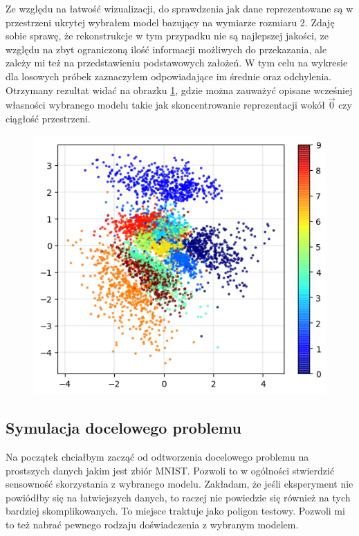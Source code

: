 Ze względu na łatwość wizualizacji, do sprawdzenia jak dane reprezentowane są w przestrzeni ukrytej wybrałem model bazujący na wymiarze rozmiaru 2. Zdaję sobie sprawę, że rekonstrukcje w tym przypadku nie są najlepszej jakości, ze względu na zbyt ograniczoną ilość informacji możliwych do przekazania, ale zależy mi też na przedstawieniu podstawowych założeń. W tym celu na wykresie dla losowych próbek zaznaczyłem odpowiadające im średnie oraz odchylenia. Otrzymany rezultat widać na obrazku \ref{fig:mnist_2d}, gdzie można zauważyć opisane wcześniej własności wybranego modelu takie jak skoncentrowanie reprezentacji wokół $\vec{0}$ czy ciągłość przestrzeni.

\begin{figure}[h!]
    \centering
    \includegraphics[width=1.\textwidth]{images/mnist_2d}
    \caption{}
    \label{fig:mnist_2d}
\end{figure}

\subsection{Symulacja docelowego problemu}

Na początek chciałbym zacząć od odtworzenia docelowego problemu na prostszych danych jakim jest zbiór MNIST. Pozwoli to w ogólności stwierdzić sensowność skorzystania z wybranego modelu. Zakładam, że jeśli eksperyment nie powiódłby się na łatwiejszych danych, to raczej nie powiedzie się również na tych bardziej skomplikowanych. To miejsce traktuje jako poligon testowy. Pozwoli mi to też nabrać pewnego rodzaju doświadczenia z wybranym modelem.

